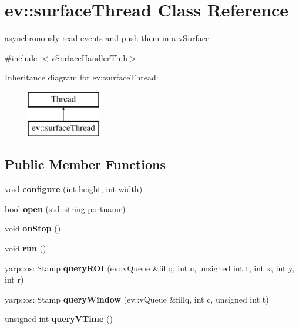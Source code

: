 \hypertarget{classev_1_1surfaceThread}{}\section{ev\+:\+:surface\+Thread Class Reference}
\label{classev_1_1surfaceThread}


asynchronously read events and push them in a \hyperlink{classev_1_1vSurface}{v\+Surface}  




{\ttfamily \#include $<$v\+Surface\+Handler\+Th.\+h$>$}

Inheritance diagram for ev\+:\+:surface\+Thread\+:\begin{figure}[H]
\begin{center}
\leavevmode
\includegraphics[height=2.000000cm]{classev_1_1surfaceThread}
\end{center}
\end{figure}
\subsection*{Public Member Functions}
\begin{DoxyCompactItemize}
\item 
\mbox{\label{classev_1_1surfaceThread_a17d8e5af5b6617d91631fe3565e7ec21}} 
void {\bfseries configure} (int height, int width)
\item 
\mbox{\label{classev_1_1surfaceThread_a8fbb7a7f67aeb8766ee1d222550306c9}} 
bool {\bfseries open} (std\+::string portname)
\item 
\mbox{\label{classev_1_1surfaceThread_a65d324c3c3d8f699412f4fa1eb5aff62}} 
void {\bfseries on\+Stop} ()
\item 
\mbox{\label{classev_1_1surfaceThread_a04b53ae45896e77a84db501ddfc956cf}} 
void {\bfseries run} ()
\item 
\mbox{\label{classev_1_1surfaceThread_a04b8a2e62c4910346bdfc2ae9c82371b}} 
yarp\+::os\+::\+Stamp {\bfseries query\+R\+OI} (ev\+::v\+Queue \&fillq, int c, unsigned int t, int x, int y, int r)
\item 
\mbox{\label{classev_1_1surfaceThread_ad552b309bca76006c5e8adc07fdcbb6a}} 
yarp\+::os\+::\+Stamp {\bfseries query\+Window} (ev\+::v\+Queue \&fillq, int c, unsigned int t)
\item 
\mbox{\label{classev_1_1surfaceThread_a763bb2d669fdc772316f074fd43c82d8}} 
unsigned int {\bfseries query\+V\+Time} ()
\end{DoxyCompactItemize}



